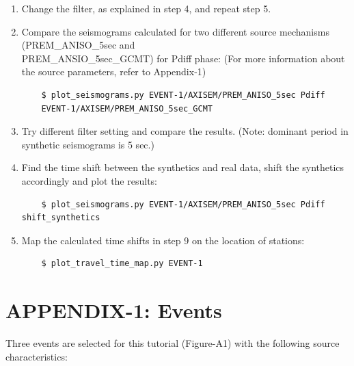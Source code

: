 \documentclass{article}
\begin{document}
\begin{enumerate}
    \item Change the filter, as explained in step 4, and repeat step 5.
    
    \item Compare the seismograms calculated for two different source mechanisms
    (PREM\_ANISO\_5sec and \\ PREM\_ANSIO\_5sec\_GCMT) for Pdiff phase: (For more
    information about the source parameters, refer to Appendix-1)
    
    \begin{verbatim}
    $ plot_seismograms.py EVENT-1/AXISEM/PREM_ANISO_5sec Pdiff 
    EVENT-1/AXISEM/PREM_ANISO_5sec_GCMT
    \end{verbatim}
    
    \item Try different filter setting and compare the results.
    (Note: dominant period in synthetic seismograms is 5 sec.)
    
    \item Find the time shift between the synthetics and real data, shift the synthetics
    accordingly and plot the results:
    
    \begin{verbatim}
    $ plot_seismograms.py EVENT-1/AXISEM/PREM_ANISO_5sec Pdiff shift_synthetics
    \end{verbatim}
    
    \item Map the calculated time shifts in step 9 on the location of stations:
    
    \begin{verbatim}
    $ plot_travel_time_map.py EVENT-1
    \end{verbatim}

\end{enumerate}

\newpage
\appendix
\section{APPENDIX-1: Events}

Three events are selected for this tutorial (Figure-A1) with the following source 
characteristics:
\end{document}
